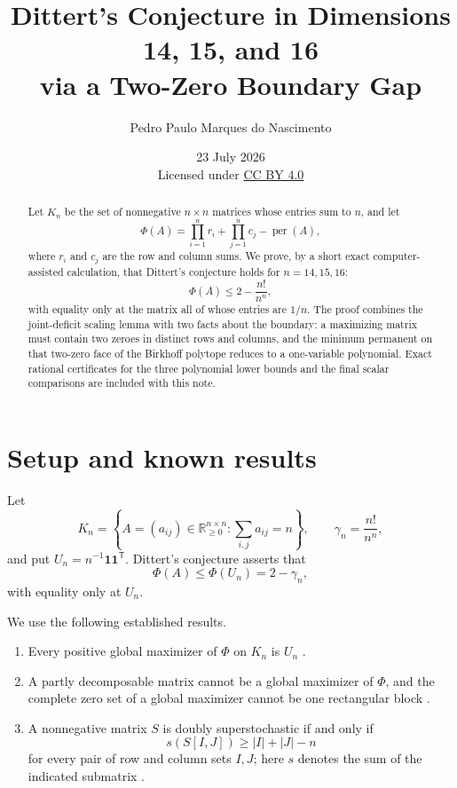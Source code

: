 \documentclass[11pt]{article}
\title{Dittert's Conjecture in Dimensions 14, 15, and 16\\
via a Two-Zero Boundary Gap}
\author{Pedro Paulo Marques do Nascimento}
\date{23 July 2026\\[0.4em]
\small Licensed under \href{https://creativecommons.org/licenses/by/4.0/}{CC BY 4.0}}
\theoremstyle{remark}
\newcommand{\per}{\operatorname{per}}
\newcommand{\R}{\mathbb{R}}
\newcommand{\one}{\mathbf{1}}
\begin{document}
\maketitle

\begin{abstract}
Let $K_n$ be the set of nonnegative $n\times n$ matrices whose entries sum to $n$, and let
\[
 \Phi(A)=\prod_{i=1}^n r_i+\prod_{j=1}^n c_j-\per(A),
\]
where $r_i$ and $c_j$ are the row and column sums.  We prove, by a short exact
computer-assisted calculation, that Dittert's conjecture holds for
$n=14,15,16$:
\[
 \Phi(A)\le 2-\frac{n!}{n^n},
\]
with equality only at the matrix all of whose entries are $1/n$.
The proof combines the joint-deficit scaling lemma with two facts about the
boundary: a maximizing matrix must contain two zeroes in distinct rows and
columns, and the minimum permanent on that two-zero face of the Birkhoff
polytope reduces to a one-variable polynomial.  Exact rational certificates
for the three polynomial lower bounds and the final scalar comparisons are
included with this note.
\end{abstract}

\section{Setup and known results}

Let
\[
 K_n=\left\{A=(a_{ij})\in\R_{\ge0}^{n\times n}:\sum_{i,j}a_{ij}=n\right\},
 \qquad
 \gamma_n=\frac{n!}{n^n},
\]
and put $U_n=n^{-1}\one\one^{\mathsf T}$.  Dittert's conjecture asserts that
\begin{equation}\label{eq:dittert}
 \Phi(A)\le \Phi(U_n)=2-\gamma_n,
\end{equation}
with equality only at $U_n$.

We use the following established results.
\begin{enumerate}[label=(\roman*)]
 \item Every positive global maximizer of $\Phi$ on $K_n$ is $U_n$ \cite{Hwang1986}.
 \item A partly decomposable matrix cannot be a global maximizer of $\Phi$, and
 the complete zero set of a global maximizer cannot be one rectangular block
 \cite[Theorems 3.2 and 3.7]{CheonWanless2012}.
 \item A nonnegative matrix $S$ is doubly superstochastic if and only if
 \begin{equation}\label{eq:li}
   s(S[I,J])\ge |I|+|J|-n
 \end{equation}
 for every pair of row and column sets $I,J$; here $s$ denotes the sum of the
 indicated submatrix \cite[Lemma 2.2]{CheonWanless2012}.
\end{enumerate}
\end{document}
